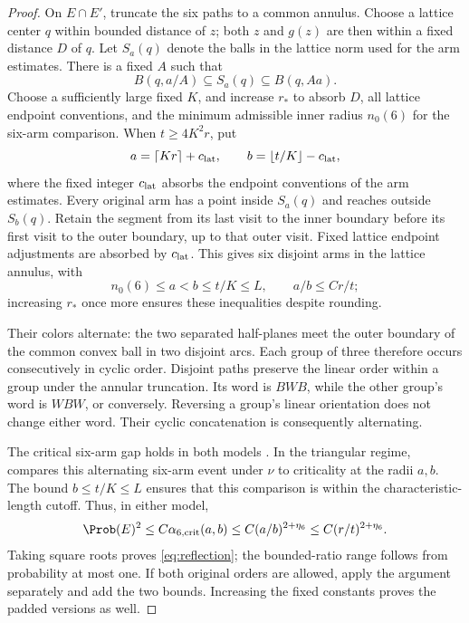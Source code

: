 \begin{proof}
On $E\cap E'$, truncate the six paths to a common annulus. Choose a lattice
center $q$ within bounded distance of $z$; both $z$ and $g(z)$ are then
within a fixed distance $D$ of $q$. Let $S_a(q)$ denote the balls in the
lattice norm used for the arm estimates. There is a fixed $A$ such that
\[
 B(q,a/A)\subseteq S_a(q)\subseteq B(q,Aa).
\]
Choose a sufficiently large fixed $K$, and increase $r_*$ to absorb $D$,
all lattice endpoint conventions, and the minimum admissible inner radius
$n_0(6)$ for the six-arm comparison.
When $t\ge4K^2r$, put
\[
 a=\lceil Kr\rceil+c_{\rm lat},\qquad
 b=\lfloor t/K\rfloor-c_{\rm lat},
\]
where the fixed integer $c_{\rm lat}$ absorbs the endpoint conventions of
the arm estimates.
Every original arm has a point inside $S_a(q)$ and reaches outside
$S_b(q)$. Retain the segment from its last visit to the inner boundary
before its first visit to the outer boundary, up to that outer visit.
Fixed lattice endpoint adjustments are absorbed by $c_{\rm lat}$.
This gives six disjoint arms in the lattice annulus, with
\[
 n_0(6)\le a<b\le t/K\le L,
 \qquad a/b\le C r/t;
\]
increasing $r_*$ once more ensures these inequalities despite rounding.

Their colors alternate: the two separated half-planes meet the outer boundary
of the common convex ball in two disjoint arcs.  Each group of three therefore occurs
consecutively in cyclic order.  Disjoint paths preserve the linear order
within a group under the annular truncation.  Its word is $BWB$, while
the other group's word is $WBW$, or conversely.  Reversing a group's
linear orientation does not change either word.  Their cyclic
concatenation is consequently alternating.

The critical six-arm gap holds in both models
\cite[Remark~4.6]{GPS}.  In the triangular regime,
\cite[Theorem~27]{Nolin} compares this alternating six-arm event under
$\nu$ to criticality at the radii $a,b$. The bound $b\le t/K\le L$
ensures that this comparison is within the characteristic-length cutoff.
Thus, in either model,
\[
 \Prob(E)^2\le C\alpha_{6,\mathrm{crit}}(a,b)
 \le C(a/b)^{2+\eta_6}
 \le C(r/t)^{2+\eta_6}.
\]
Taking square roots proves \eqref{eq:reflection}; the bounded-ratio
range follows from probability at most one.  If both original orders
are allowed, apply the argument separately and add the two bounds.
Increasing the fixed constants proves the padded versions as well.
\end{proof}

